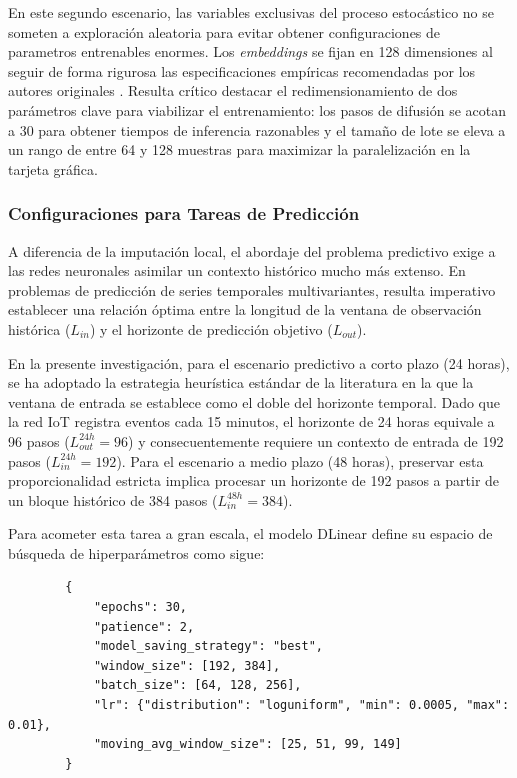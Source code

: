 En este segundo escenario, las variables exclusivas del proceso estocástico no se someten a exploración aleatoria para evitar obtener configuraciones de parametros entrenables enormes. Los \textit{embeddings} se fijan en 128 dimensiones al seguir de forma rigurosa las especificaciones empíricas recomendadas por los autores originales \parencite{tashiro2021csdi}. Resulta crítico destacar el redimensionamiento de dos parámetros clave para viabilizar el entrenamiento: los pasos de difusión se acotan a 30 para obtener tiempos de inferencia razonables y el tamaño de lote se eleva a un rango de entre 64 y 128 muestras para maximizar la paralelización en la tarjeta gráfica.

\subsubsection{Configuraciones para Tareas de Predicción}

A diferencia de la imputación local, el abordaje del problema predictivo exige a las redes neuronales asimilar un contexto histórico mucho más extenso. En problemas de predicción de series temporales multivariantes, resulta imperativo establecer una relación óptima entre la longitud de la ventana de observación histórica ($L_{in}$) y el horizonte de predicción objetivo ($L_{out}$). 

En la presente investigación, para el escenario predictivo a corto plazo (24 horas), se ha adoptado la estrategia heurística estándar de la literatura en la que la ventana de entrada se establece como el doble del horizonte temporal. Dado que la red IoT registra eventos cada 15 minutos, el horizonte de 24 horas equivale a 96 pasos ($L_{out}^{24h} = 96$) y consecuentemente requiere un contexto de entrada de 192 pasos ($L_{in}^{24h} = 192$). Para el escenario a medio plazo (48 horas), preservar esta proporcionalidad estricta implica procesar un horizonte de 192 pasos a partir de un bloque histórico de 384 pasos ($L_{in}^{48h} = 384$).

Para acometer esta tarea a gran escala, el modelo DLinear define su espacio de búsqueda de hiperparámetros como sigue:

\begin{listing}[H]
	\caption{Espacio de búsqueda y configuración base para la arquitectura DLinear.}
	\label{lst:json_dlinear}
	\begin{verbatim}
		{
			"epochs": 30,
			"patience": 2,
			"model_saving_strategy": "best",
			"window_size": [192, 384],
			"batch_size": [64, 128, 256],
			"lr": {"distribution": "loguniform", "min": 0.0005, "max": 0.01},
			"moving_avg_window_size": [25, 51, 99, 149]
		}
	\end{verbatim}
\end{listing}

